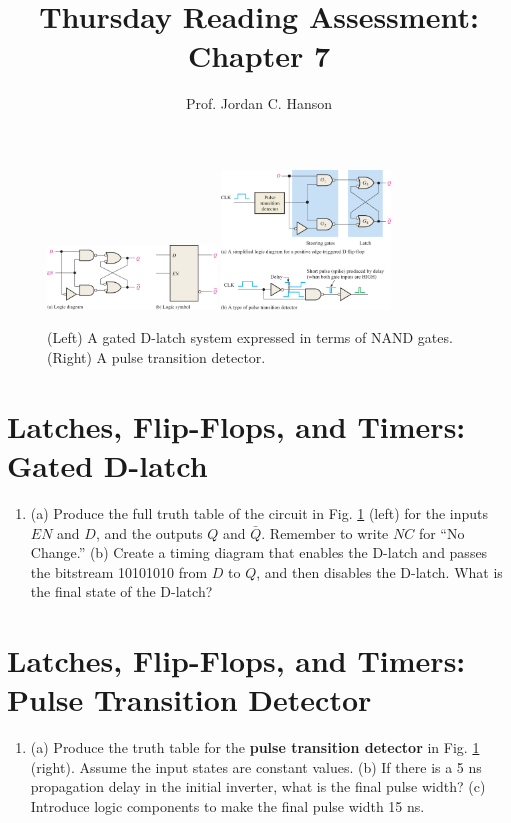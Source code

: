 \documentclass{article}
\begin{document}
\title{Thursday Reading Assessment: Chapter 7}
\author{Prof. Jordan C. Hanson}

\maketitle

\begin{figure}[ht]
\centering
\includegraphics[width=0.4\textwidth,trim=0cm 1cm 0cm 0cm,clip=true]{figures/gated_D_latch.jpg} \hspace{0.1cm}
\includegraphics[width=0.4\textwidth,trim=0cm 0.5cm 0cm 9cm,clip=true]{figures/PTD.jpg}
\caption{\label{fig:1} (Left) A gated D-latch system expressed in terms of NAND gates. (Right) A pulse transition detector.}
\end{figure}

\section{Latches, Flip-Flops, and Timers: Gated D-latch}

\begin{enumerate}
\item (a) Produce the full truth table of the circuit in Fig. \ref{fig:1} (left) for the inputs $EN$ and $D$, and the outputs $Q$ and $\bar{Q}$. Remember to write $NC$ for ``No Change.'' (b) Create a timing diagram that enables the D-latch and passes the bitstream 10101010 from $D$ to $Q$, and then disables the D-latch.  What is the final state of the D-latch? \\ \vspace{2cm}
\end{enumerate}

\section{Latches, Flip-Flops, and Timers: Pulse Transition Detector}

\begin{enumerate}
\item (a) Produce the truth table for the \textbf{pulse transition detector} in Fig. \ref{fig:1} (right).  Assume the input states are constant values.  (b) If there is a 5 ns propagation delay in the initial inverter, what is the final pulse width?  (c) Introduce logic components to make the final pulse width 15 ns. \\ \vspace{2cm}
\end{enumerate}
\end{document}
